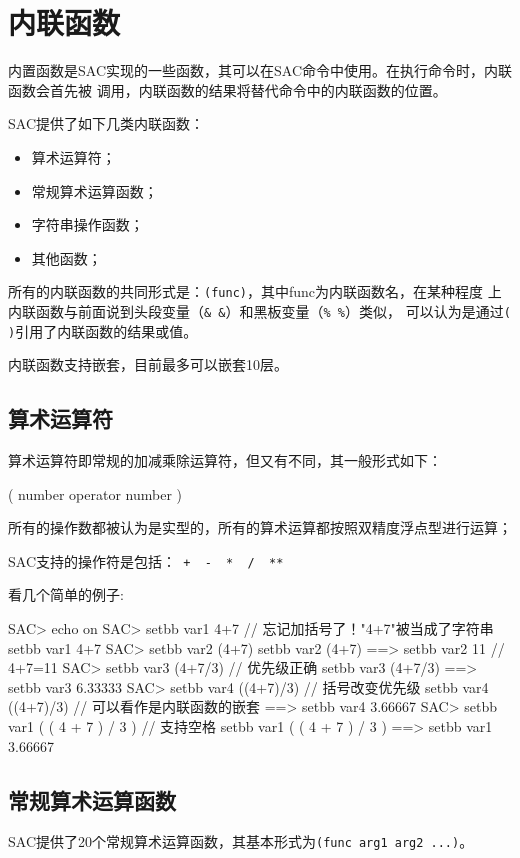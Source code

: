 \section{内联函数}

内置函数是SAC实现的一些函数，其可以在SAC命令中使用。在执行命令时，内联函数会首先被
调用，内联函数的结果将替代命令中的内联函数的位置。

SAC提供了如下几类内联函数：
\begin{itemize}
\item 算术运算符；
\item 常规算术运算函数；
\item 字符串操作函数；
\item 其他函数；
\end{itemize}

所有的内联函数的共同形式是：\lstinline{(func)}，其中func为内联函数名，在某种程度
上内联函数与前面说到头段变量（\lstinline{& &}）和黑板变量（\lstinline{% %}）类似，
可以认为是通过\lstinline{( )}引用了内联函数的结果或值。

内联函数支持嵌套，目前最多可以嵌套10层。

\subsection{算术运算符}
算术运算符即常规的加减乘除运算符，但又有不同，其一般形式如下：
\begin{SACCode}
    ( number operator number ) 
\end{SACCode}
所有的操作数都被认为是实型的，所有的算术运算都按照双精度浮点型进行运算；

SAC支持的操作符是包括：\lstinline{ +  -  *  /  ** }

看几个简单的例子:
\begin{SACCode}
SAC> echo on                
SAC> setbb var1 4+7             // 忘记加括号了！"4+7"被当成了字符串
 setbb var1 4+7
SAC> setbb var2 (4+7)           
 setbb var2 (4+7)
 ==>  setbb var2 11             // 4+7=11
SAC> setbb var3 (4+7/3)         // 优先级正确
 setbb var3 (4+7/3)
 ==>  setbb var3 6.33333
SAC> setbb var4 ((4+7)/3)       // 括号改变优先级
 setbb var4 ((4+7)/3)           // 可以看作是内联函数的嵌套
 ==>  setbb var4 3.66667
SAC> setbb var1 ( ( 4 + 7 ) / 3 )   // 支持空格
 setbb var1 ( ( 4 + 7 ) / 3 )
 ==>  setbb var1 3.66667
\end{SACCode}

\subsection{常规算术运算函数}
SAC提供了20个常规算术运算函数，其基本形式为\lstinline{(func arg1 arg2 ...)}。


